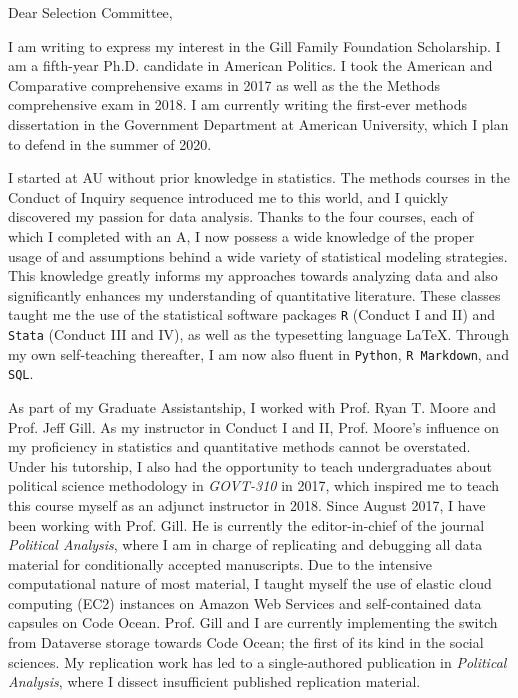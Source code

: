 \documentclass[10pt,letterpaper,dateno,sigleft]{newlfm}
\begin{document}
\begin{newlfm}


\vspace{-0.3cm}

Dear Selection Committee,

\vspace{0.15cm}

I am writing to express my interest in the Gill Family Foundation Scholarship. I am a fifth-year Ph.D. candidate in American Politics. I took the American and Comparative comprehensive exams in 2017 as well as the the Methods comprehensive exam in 2018. I am currently writing the first-ever methods dissertation in the Government Department at American University, which I plan to defend in the summer of 2020. 

I started at AU without prior knowledge in statistics. The methods courses in the Conduct of Inquiry sequence introduced me to this world, and I quickly discovered my passion for data analysis. Thanks to the four courses, each of which I completed with an A, I now possess a wide knowledge of the proper usage of and assumptions behind a wide variety of statistical modeling strategies. This knowledge greatly informs my approaches towards analyzing data and also significantly enhances my understanding of quantitative literature. These classes taught me the use of the statistical software packages {\tt R} (Conduct I and II) and {\tt Stata} (Conduct III and IV), as well as the typesetting language {\lsstyle \LaTeX}. Through my own self-teaching thereafter, I am now also fluent in {\tt Python}, {\tt R Markdown}, and {\tt SQL}.


As part of my Graduate Assistantship, I worked with Prof. Ryan T. Moore and Prof. Jeff Gill. As my instructor in Conduct I and II, Prof. Moore's influence on my proficiency in statistics and quantitative methods cannot be overstated. Under his tutorship, I also had the opportunity to teach undergraduates about political science methodology in \textit{GOVT-310} in 2017, which inspired me to teach this course myself as an adjunct instructor in 2018. Since August 2017, I have been working with Prof. Gill. He is currently the editor-in-chief of the journal \textit{Political Analysis}, where I am in charge of replicating and debugging all data material for conditionally accepted manuscripts. Due to the intensive computational nature of most material, I taught myself the use of elastic cloud computing (EC2) instances on Amazon Web Services and self-contained data capsules on Code Ocean. Prof. Gill and I are currently implementing the switch from Dataverse storage towards Code Ocean; the first of its kind in the social sciences. My replication work has led to a single-authored publication in \textit{Political Analysis}, where I dissect insufficient published replication material. 
 


\end{newlfm}
\end{document}
